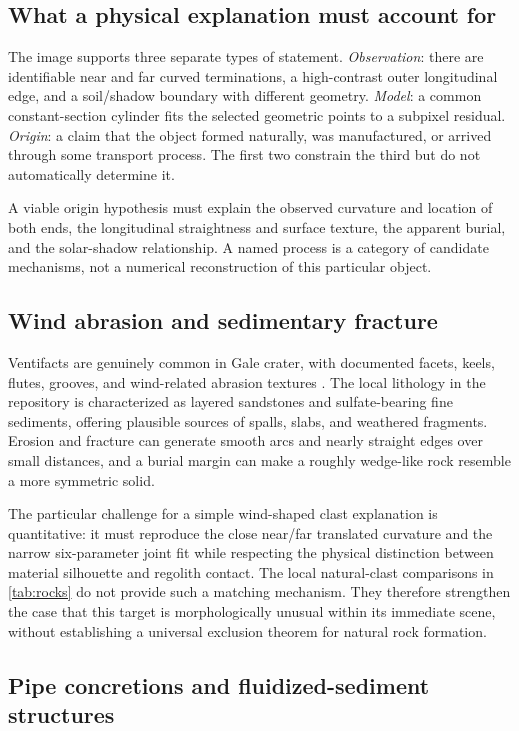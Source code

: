 \documentclass[11pt,letterpaper]{article}
\begin{document}
\subsection{What a physical explanation must account for}

The image supports three separate types of statement. \emph{Observation}: there are identifiable near and far curved terminations, a high-contrast outer longitudinal edge, and a soil/shadow boundary with different geometry. \emph{Model}: a common constant-section cylinder fits the selected geometric points to a subpixel residual. \emph{Origin}: a claim that the object formed naturally, was manufactured, or arrived through some transport process. The first two constrain the third but do not automatically determine it.

A viable origin hypothesis must explain the observed curvature and location of both ends, the longitudinal straightness and surface texture, the apparent burial, and the solar-shadow relationship. A named process is a category of candidate mechanisms, not a numerical reconstruction of this particular object.

\subsection{Wind abrasion and sedimentary fracture}

Ventifacts are genuinely common in Gale crater, with documented facets, keels, flutes, grooves, and wind-related abrasion textures \cite{bridges2014}. The local lithology in the repository is characterized as layered sandstones and sulfate-bearing fine sediments, offering plausible sources of spalls, slabs, and weathered fragments. Erosion and fracture can generate smooth arcs and nearly straight edges over small distances, and a burial margin can make a roughly wedge-like rock resemble a more symmetric solid.

The particular challenge for a simple wind-shaped clast explanation is quantitative: it must reproduce the close near/far translated curvature and the narrow six-parameter joint fit while respecting the physical distinction between material silhouette and regolith contact. The local natural-clast comparisons in \cref{tab:rocks} do not provide such a matching mechanism. They therefore strengthen the case that this target is morphologically unusual within its immediate scene, without establishing a universal exclusion theorem for natural rock formation.

\subsection{Pipe concretions and fluidized-sediment structures}
\end{document}
